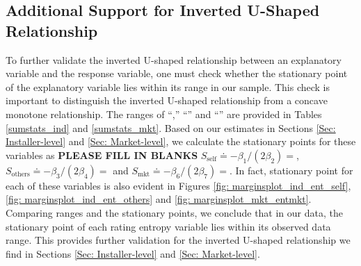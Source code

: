 \documentclass[msom,blindrev]{informs3}
\begin{document}
%
%
%
%




\subsection{Additional Support for Inverted U-Shaped Relationship}

To further validate the inverted U-shaped relationship between an explanatory variable and the response variable, one must check whether the stationary point of the explanatory variable lies within its range in our sample. This check is important to distinguish the inverted U-shaped relationship from a concave monotone relationship.  The ranges of ``,'' ``'' and ``'' are provided in Tables \ref{sumstats_ind} and \ref{sumstats_mkt}.
Based on our estimates in Sections \ref{Sec: Installer-level} and \ref{Sec: Market-level}, we calculate the stationary points for these variables as \textbf{PLEASE FILL IN BLANKS} $S_{\text{self}} \doteq - \beta_{1}/ (2 \beta_{2}) = $, $S_{\text{others}} \doteq  - \beta_{3}/(2 \beta_{4}) = $ and $S_{\text{mkt}} \doteq - \beta_{6}/(2 \beta_{7}) = $. In fact, stationary point for each of these variables is also evident in Figures \ref{fig: marginsplot_ind_ent_self}, \ref{fig: marginsplot_ind_ent_others} and \ref{fig: marginsplot_mkt_entmkt}. Comparing ranges and the stationary points, we conclude that in our data, the stationary point of each rating entropy variable lies within its observed data range. This provides further validation for the inverted U-shaped relationship we find in Sections \ref{Sec: Installer-level} and \ref{Sec: Market-level}.
\end{document}
